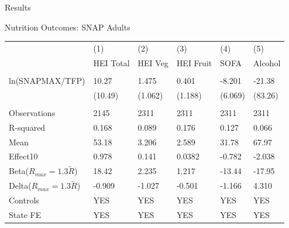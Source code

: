 \documentclass{beamer}
\begin{document}
\begin{frame}{Results}
\begin{table}{Nutrition Outcomes: SNAP Adults}
\begin{adjustbox}{max width=\textwidth}
\begin{tabular}{llllll}
\toprule
 & (1) & (2) & (3) & (4) & (5) \\
 & HEI Total & HEI Veg & HEI Fruit & SOFA & Alcohol \\
\midrule
 \\
ln(SNAPMAX/TFP) & 10.27 & 1.475 & 0.401 & -8.201 & -21.38 \\
 & (10.49) & (1.062) & (1.188) & (6.069) & (83.26) \\
 \\
Observations & 2145 & 2311 & 2311 & 2311 & 2311 \\
R-squared & 0.168 & 0.089 & 0.176 & 0.127 & 0.066 \\
Mean & 53.18 & 3.206 & 2.589 & 31.78 & 67.97 \\
Effect10 & 0.978 & 0.141 & 0.0382 & -0.782 & -2.038 \\
Beta($R_{max}=1.3\tilde{R}$) & 18.42 & 2.235 & 1.217 & -13.44 & -17.95 \\
Delta($R_{max}=1.3\tilde{R}$) & -0.909 & -1.027 & -0.501 & -1.166 & 4.310 \\
Controls & YES & YES & YES & YES & YES \\
State FE & YES & YES & YES & YES & YES \\
\bottomrule
\end{tabular}
\end{adjustbox}
\end{table}
\end{frame}
\end{document}

